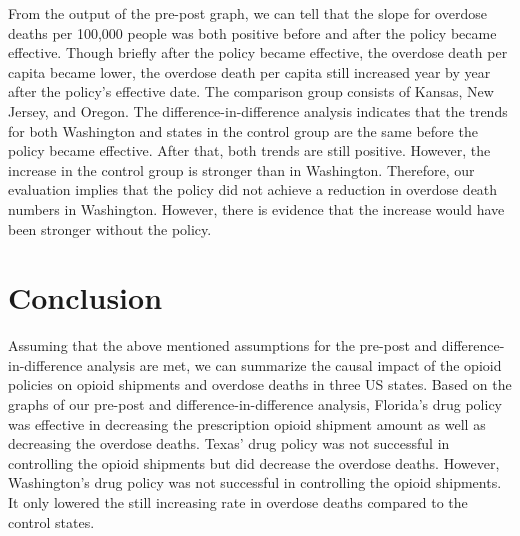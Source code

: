 \documentclass[12pt,letterpaper]{article}
\begin{document}
From the output of the pre-post graph, we can tell that the slope for overdose deaths per 100,000 people was both positive before and after the policy became effective. Though briefly after the policy became effective, the overdose death per capita became lower, the overdose death per capita still increased year by year after the policy's effective date. The comparison group consists of Kansas, New Jersey, and Oregon. The difference-in-difference analysis indicates that the trends for both Washington and states in the control group are the same before the policy  became effective. After that, both trends are still positive. However, the increase in the control group is stronger than in Washington. Therefore, our evaluation implies that the policy did not achieve a reduction in overdose death numbers in Washington. However, there is evidence that the increase would have been stronger without the policy.


\section{Conclusion}

Assuming that the above mentioned assumptions for the pre-post and difference-in-difference analysis are met, we can summarize the causal impact of the opioid policies on opioid shipments and overdose deaths in three US states. Based on the graphs of our pre-post and difference-in-difference analysis, Florida's drug policy was effective in decreasing the prescription opioid shipment amount as well as decreasing the overdose deaths. Texas' drug policy was not successful in controlling the opioid shipments but did decrease the overdose deaths. However, Washington's drug policy was not successful in controlling the opioid shipments. It only lowered the still increasing rate in overdose deaths compared to the control states.
\end{document}
